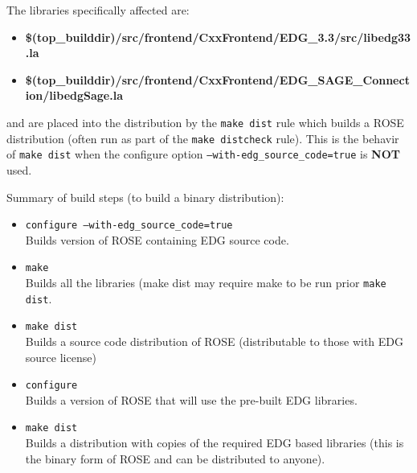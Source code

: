 The libraries specifically affected are:
\begin{itemize}
   \item {\bf \$(top_builddir)/src/frontend/CxxFrontend/EDG_3.3/src/libedg33.la}
   \item {\bf \$(top_builddir)/src/frontend/CxxFrontend/EDG_SAGE_Connection/libedgSage.la}
\end{itemize}
and are placed into the distribution by the {\tt make dist} rule which builds a ROSE distribution
(often run as part of the {\tt make distcheck} rule).  This is the behavir of {\tt make dist}
when the configure option {\tt --with-edg_source_code=true} is {\bf NOT} used.

Summary of build steps (to build a binary distribution):
\begin{itemize}
   \item {\tt configure --with-edg_source_code=true} \\
          Builds version of ROSE containing EDG source code.
   \item  {\tt make} \\
          Builds all the libraries (make dist may require make to be run prior {\tt make dist}.
   \item  {\tt make dist} \\
          Builds a source code distribution of ROSE (distributable to those with EDG source license)
   \item {\tt configure} \\
          Builds a version of ROSE that will use the pre-built EDG libraries.
   \item {\tt make dist} \\
          Builds a distribution with copies of the required EDG based libraries
          (this is the binary form of ROSE and can be distributed to anyone).
\end{itemize}


